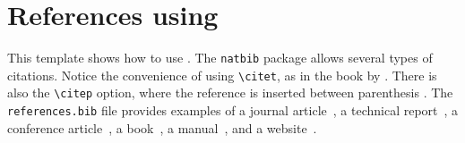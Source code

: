 \documentclass[conference,a4paper]{IEEEtran}
\begin{document}
\section{References using \BibTeX}

This template shows how to use \BibTeX.
The \texttt{natbib} package allows several types of citations.
Notice the convenience of using \verb|\citet|, as in the book by \citet{BrockwellDavis91}.
There is also the \verb|\citep| option, where the reference is inserted between parenthesis \citep{OverviewofthePolSARproV4.0SoftwaretheOpenSourceToolboxforPolarimetricandInterferometricPolarimetricSARDataProcessing}.
The \verb|references.bib| file provides examples of a journal article~\citep{ABadgingSystemforReproducibilityandReplicabilityinRemoteSensingResearch},
a technical report~\citep{SystemCalibrationStrategiesforSpaceborneSyntheticApertureRadarforOceanography}, a conference article~\cite{OverviewofthePolSARproV4.0SoftwaretheOpenSourceToolboxforPolarimetricandInterferometricPolarimetricSARDataProcessing}, a book~\cite{BrockwellDavis91}, a manual~\cite{ERMANIIUsersManual}, and a website~\cite{simplexCT}.

\small


\end{document}
